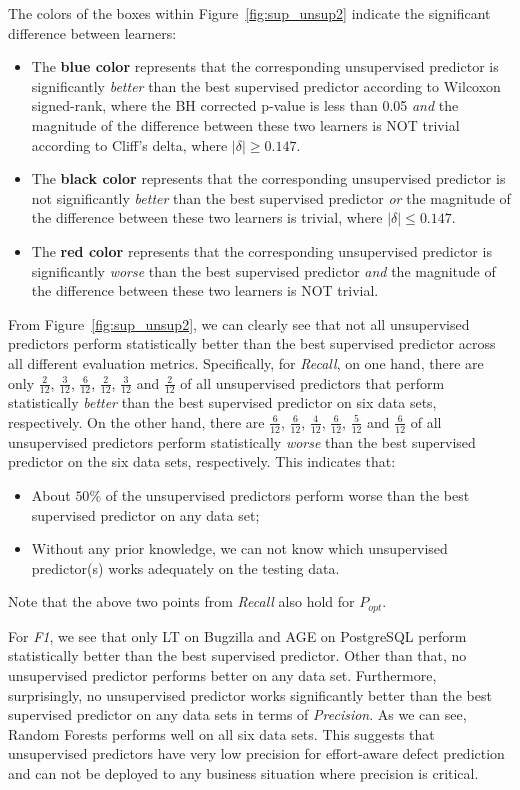 \documentclass[sigconf]{acmart}
\theoremstyle{break}
\newcommand{\bi}{\begin{itemize}[leftmargin=0.4cm]}
\newcommand{\ei}{\end{itemize}}
\newcommand{\fig}[1]{Figure~\ref{fig:#1}}
\begin{document}
The colors of the boxes within \fig{sup_unsup2} indicate
the significant difference between learners:
\bi
\item
The {\bf  blue color} represents that the corresponding  unsupervised predictor
is significantly {\it better} than the best supervised predictor according to Wilcoxon signed-rank, where the
BH corrected p-value is less than 0.05 {\it and} the magnitude of the difference between these two learners is NOT trivial
according to Cliff's delta, where $|\delta| \geq 0.147$.
\item
The {\bf black color} represents that the corresponding unsupervised predictor is not significantly {\it better} than the best supervised predictor {\it or} the magnitude of the difference between these two learners is trivial, where $|\delta| \leq 0.147$.
\item
The {\bf red color} represents that the corresponding unsupervised predictor is significantly {\it worse} than the best supervised predictor {\it and} the  magnitude of the difference between these two learners is NOT trivial.
\ei
From   \fig{sup_unsup2},  we can clearly see that not all unsupervised
predictors perform statistically better than the best supervised predictor
across all different evaluation metrics. Specifically, for {\it Recall}, 
on one hand, there are only $\frac{2}{12}$,
$\frac{3}{12}$, $\frac{6}{12}$, $\frac{2}{12}$, $\frac{3}{12}$ and $\frac{2}{12}$ of
all unsupervised predictors that perform statistically {\it better} than
the best supervised predictor on six data sets, respectively.
On the other hand, there are $\frac{6}{12}$, $\frac{6}{12}$, $\frac{4}{12}$, $\frac{6}{12}$,
$\frac{5}{12}$ and $\frac{6}{12}$ of
all unsupervised predictors perform statistically {\it worse} than the best supervised predictor on the six data sets, respectively. This indicates that:
\bi
\item
About $50\%$ of the unsupervised predictors   
perform worse than the best supervised predictor on any data set;
\item
Without any prior knowledge,  we can not  know which
unsupervised predictor(s)   works adequately on the testing data. 
\ei
Note that the above two
points from   {\it Recall} also hold for $ P_{opt}$.


For {\it F1}, we see that only LT on Bugzilla and AGE on PostgreSQL
 perform statistically better than the best supervised predictor. 
 Other than that, no unsupervised predictor performs better on any data set. Furthermore, surprisingly,
 no unsupervised predictor works significantly better than the best supervised predictor on any 
data sets in terms of {\it Precision}. As we can see, Random Forests performs well on all six data sets.
This suggests that unsupervised predictors have very low
precision for effort-aware defect prediction and can not be deployed to any business situation where precision is critical.
\end{document}
